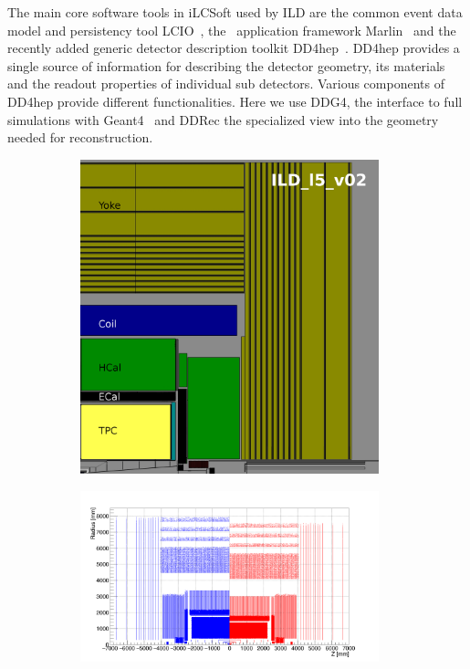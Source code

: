 The main core software tools in iLCSoft used by ILD are the common event data model and persistency tool LCIO~\cite{Gaede:2003ip},
the \CPP\ application framework Marlin~\cite{Gaede:2006pj} and the recently added generic detector description toolkit
DD4hep~\cite{Frank:2014zya,Frank:2015ivo}. DD4hep provides a single source of information for describing the detector geometry, its
materials and the readout properties of individual sub detectors. Various components of DD4hep provide different functionalities.
Here we use DDG4, the interface to full simulations with Geant4~\cite{Agostinelli:2002hh} and DDRec the specialized view into the
geometry needed for reconstruction.
%
%
\begin{figure}[b!]
  \begin{subfigure}{0.40\hsize}
    \includegraphics[width=0.95\textwidth]{Modelling/fig/ILD_l5_v02_sideview_gimp_2.jpg}
    \caption{ \label{fig:sim_model_quad}}
  \end{subfigure}
  \begin{subfigure}{0.60\hsize}
    \includegraphics[width=0.95\textwidth]{Modelling/fig/hits_rz_small_large_ILD.png}

\end{subfigure}
\end{figure}
